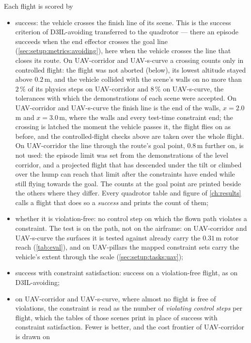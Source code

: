 Each flight is scored by
\begin{itemize}
  \item success: the vehicle crosses the finish line of its scene. This is the success
    criterion of D3IL-avoiding transferred to the quadrotor --- there an episode succeeds when the end effector
    crosses the goal line (\autoref{sec:setup:metrics:avoiding}), here when the vehicle crosses the line
    that closes its route. On UAV-corridor and UAV-s-curve a crossing counts only in controlled flight: the
    flight was not aborted (below), its lowest altitude stayed above $0.2$\,m, and the vehicle collided with
    the scene's walls on no more than $2\,\%$ of its physics steps on UAV-corridor and $8\,\%$ on
    UAV-s-curve, the tolerances with which the demonstrations of each scene were accepted. On UAV-corridor
    and UAV-s-curve the finish line is the end of the walls, $x=2.0$\,m and $x=3.0$\,m, where the walls and
    every test-time constraint end; the crossing is latched the moment the vehicle passes it, the flight flies
    on as before, and the controlled-flight checks above are taken over the whole flight. On
    UAV-corridor the line through the route's goal point, $0.8$\,m further on, is not used: the episode limit was set from the
    demonstrations of the level corridor, and a projected flight that has descended under the tilt or climbed
    over the hump can reach that limit after the constraints have ended while still flying towards the goal.
    The counts at the goal point are printed beside the others where they differ. Every quadrotor
    table and figure of \autoref{ch:results} calls a flight that does so a \emph{success} and prints the
    count of them;
  \item whether it is violation-free: no control step on which the flown path violates a constraint. The
    test is on the path, not on the airframe: on UAV-corridor and UAV-s-curve the surfaces it is tested
    against already carry the $0.31$\,m rotor reach (\autoref{tab:eval}), and on UAV-pillars the mapped
    constraint sets carry the vehicle's extent through the scale (\autoref{sec:setup:tasks:uav});
  \item success with constraint satisfaction: success on a violation-free flight, as on
    D3IL-avoiding;
  \item on UAV-corridor and UAV-s-curve, where almost no flight is free of violations, the constraint is read
    as the number of \emph{violating control steps} per flight, which the tables of those scenes print in place
    of success with constraint satisfaction. Fewer is better, and the cost frontier of UAV-corridor is drawn on

\end{itemize}
